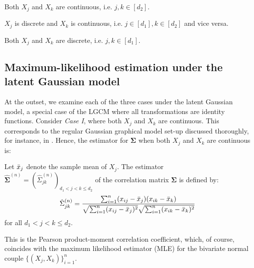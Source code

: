 \begin{description}[labelwidth=4em,leftmargin =\dimexpr\labelwidth+\labelsep\relax, font=\mdseries]
    \item[\textit{Case I}:] Both $X_j$ and $X_k$ are continuous, i.e. $j,k \in [d_2]$.
    \item[\textit{Case II}:] $X_j$ is discrete and $X_k$ is continuous, i.e. \(j\in [d_1], k\in [d_2]\) and vice versa.
    \item[\textit{Case III}:] Both $X_j$ and $X_k$ are discrete, i.e. $j,k \in [d_1]$.
\end{description}

\subsection{Maximum-likelihood estimation under the latent Gaussian model}\label{sec::latent_gaussian}

At the outset, we examine each of the three cases under the latent Gaussian model, a special case of the LGCM where all transformations are identity functions. Consider \textit{Case I}, where both $X_j$ and $X_k$ are continuous. This corresponds to the regular Gaussian graphical model set-up discussed thoroughly, for instance, in \citet{Ravikumar11}. Hence, the estimator for $\mathbf\Sigma$ when both $X_j$ and $X_k$ are continuous is:
\begin{definition}\label{def1}
    Let $\Bar{x}_j$ denote the sample mean of $X_j$. The estimator $\hat{\mathbf{\Sigma}}^{(n)} = (\hat{\Sigma}_{jk}^{(n)})_{d_1 < j < k\leq d_2}$ of the correlation matrix $\mathbf{\Sigma}$ is defined by:
    \begin{equation}
        \hat{\Sigma}_{jk}^{(n)} = \frac{\sum_{i=1}^n(x_{ij}- \Bar{x}_j)(x_{ik}- \Bar{x}_k)}{\sqrt{\sum_{i=1}^n(x_{ij}- \Bar{x}_j)^2} \sqrt{\sum_{i=1}^n(x_{ik}- \Bar{x}_k)^2}}
    \end{equation}
    for all $d_1 < j < k \leq d_2$.
\end{definition}
This is the Pearson product-moment correlation coefficient, which, of course, coincides with the maximum likelihood estimator (MLE) for the bivariate normal couple $\{(X_j, X_k)\}_{i=1}^n$.

